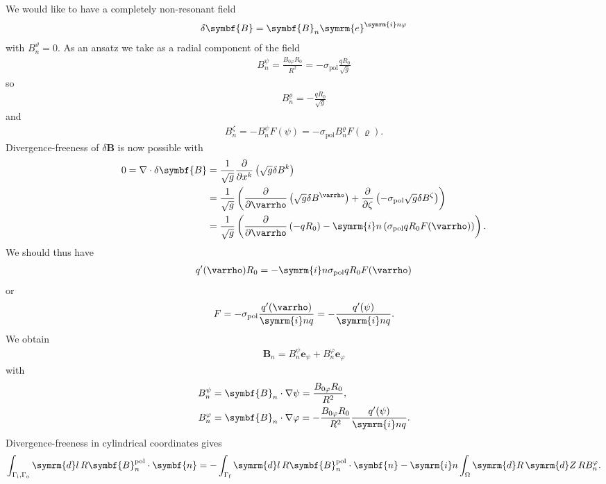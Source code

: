 \documentclass[a4paper, 10pt, english]{article}
\let\temp\varrho
\let\varrho\rho
\let\rho\temp
\let\temp\vartheta
\let\vartheta\theta
\let\theta\temp
\let\temp\varphi
\let\varphi\phi
\let\phi\temp
\let\vec\symbf
\newcommand*\diff{\ensuremath{\symrm{d}}}  %
\newcommand*\e{\ensuremath{\symrm{e}}}  %
\newcommand*\im{\ensuremath{\symrm{i}}}  %
\newcommand*\pd[2][]{\ensuremath{\frac{\partial #1}{\partial #2}}}  %
\newcommand*\pol{\ensuremath{\textrm{pol}}}  %
\newcommand*\fs{\ensuremath{\textrm{f}}}  %
\newcommand*\inw{\ensuremath{\textrm{i}}}  %
\newcommand*\out{\ensuremath{\textrm{o}}}  %
\begin{document}
We would like to have a completely non-resonant field
\begin{gather*}
  \delta \vec{B} = \vec{B}_{n} \e^{\im n \phi}
\end{gather*}
with $B_{n}^{\theta} = 0$. As an ansatz we take as a radial component of the field
\begin{gather}
  B_{n}^{\psi} = \frac{B_{0 \phi} R_{0}}{R^{2}} = -\sigma_{\pol} \frac{q R_{0}}{\sqrt{g}}
\end{gather}
so
\begin{gather*}
  B_{n}^{\rho} = -\frac{q R_{0}}{\sqrt{g}}
\end{gather*}
and
\begin{gather*}
  B_{n}^{\zeta} = -B_{n}^{\psi} F(\psi) = -\sigma_{\pol} B_{n}^{\rho} F(\rho).
\end{gather*}
Divergence-freeness of $\delta \vec{B}$ is now possible with
\begin{align*}
  0 = \nabla \cdot \delta \vec{B} &= \frac{1}{\sqrt{g}} \pd{x^{k}} \left( \sqrt{g} \delta B^{k} \right) \\
  &= \frac{1}{\sqrt{g}} \left( \pd{\rho} \left( \sqrt{g} \delta B^{\rho} \right) + \pd{\zeta} \left( -\sigma_{\pol} \sqrt{g} \delta B^{\zeta} \right) \right) \\
  &= \frac{1}{\sqrt{g}} \left(\pd{\rho} \left( -q R_{0} \right) - \im n \left( \sigma_{\pol} q R_{0} F(\rho) \right) \right).
\end{align*}
We should thus have 
\begin{gather*}
  q' (\rho) R_{0} = -\im n \sigma_{\pol} q R_{0} F(\rho)
\end{gather*}
or
\begin{gather*}
  F = -\sigma_{\pol} \frac{q' (\rho)}{\im n q} = -\frac{q' (\psi)}{\im n q}.
\end{gather*}
We obtain
\begin{gather*}
  \vec{B}_{n} = B_{n}^{\psi} \vec{e}_{\psi} + B_{n}^{\phi} \vec{e}_{\phi}
\end{gather*}
with
\begin{align*}
  B_{n}^{\psi} &= \vec{B}_{n} \cdot \nabla \psi = \frac{B_{0 \phi} R_{0}}{R^{2}}, \\
  B_{n}^{\phi} &= \vec{B}_{n} \cdot \nabla \phi = -\frac{B_{0 \phi} R_{0}}{R^{2}} \frac{q' (\psi)}{\im n q}.
\end{align*}
Divergence-freeness in cylindrical coordinates gives
\begin{gather*}
  \int_{\Gamma_{\inw}, \Gamma_{\out}} \diff l \, R \vec{B}_{n}^{\pol} \cdot \vec{n} = -\int_{\Gamma_{\fs}} \diff l \, R \vec{B}_{n}^{\pol} \cdot \vec{n} - \im n \int_{\Omega} \diff R \, \diff Z \, R B_{n}^{\phi}.
\end{gather*}
\end{document}
